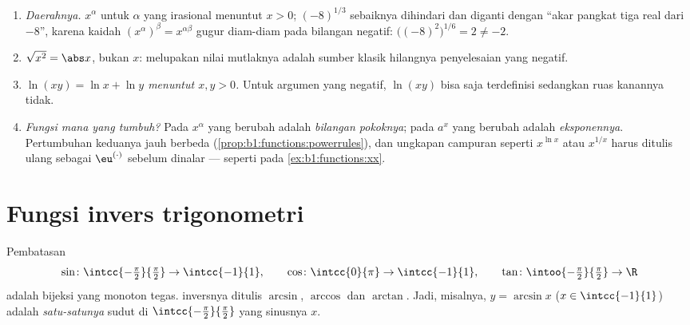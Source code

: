 \begin{remark}\label{rem:b1:functions:pitfalls}
\begin{enumerate}
  \item \emph{Daerahnya.} $x^\alpha$ untuk $\alpha$ yang irasional menuntut
        $x > 0$; $(-8)^{1/3}$ sebaiknya dihindari dan diganti dengan ``akar
        pangkat tiga real dari $-8$'', karena kaidah
        $(x^\alpha)^\beta = x^{\alpha\beta}$ gugur diam-diam pada
        bilangan negatif: $\bigl((-8)^2\bigr)^{1/6} = 2 \neq -2$.
  \item \emph{$\sqrt{x^2} = \abs x$}, bukan $x$: melupakan
        nilai mutlaknya adalah sumber klasik hilangnya penyelesaian
        yang negatif.
  \item \emph{$\ln(xy) = \ln x + \ln y$ menuntut $x, y > 0$.} Untuk
        argumen yang negatif, $\ln(xy)$ bisa saja terdefinisi sedangkan
        ruas kanannya tidak.
  \item \emph{Fungsi mana yang tumbuh?} Pada $x^\alpha$ yang
        berubah adalah \emph{bilangan pokoknya}; pada $a^x$ yang berubah
        adalah \emph{eksponennya}. Pertumbuhan keduanya jauh berbeda
        (\cref{prop:b1:functions:powerrules}), dan ungkapan
        campuran seperti $x^{\ln x}$ atau $x^{1/x}$ harus
        ditulis ulang sebagai $\eu^{(\cdot)}$ sebelum dinalar ---
        seperti pada \cref{ex:b1:functions:xx}.
\end{enumerate}
\end{remark}

\section{Fungsi invers trigonometri}

\begin{definition}[$\arcsin$, $\arccos$, $\arctan$]\label{def:b1:functions:arc}
Pembatasan
\[
\sin \colon \intcc{-\tfrac\pi2}{\tfrac\pi2} \to \intcc{-1}{1},
\qquad
\cos \colon \intcc{0}{\pi} \to \intcc{-1}{1},
\qquad
\tan \colon \intoo{-\tfrac\pi2}{\tfrac\pi2} \to \R
\]
adalah bijeksi yang monoton tegas.  inversnya ditulis
$\arcsin$, $\arccos$ dan
$\arctan$. Jadi, misalnya, $y = \arcsin x$
($x \in \intcc{-1}{1}$) adalah \emph{satu-satunya} sudut di
$\intcc{-\frac\pi2}{\frac\pi2}$ yang sinusnya $x$.
\end{definition}

